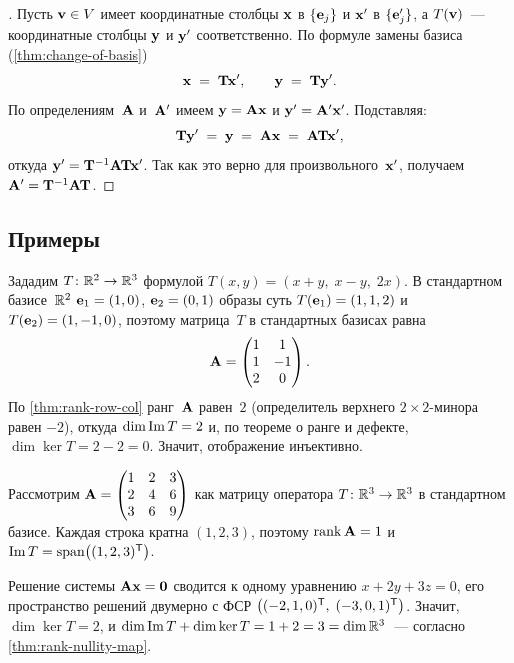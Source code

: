\begin{proof}[]
Пусть $\mathbf{v} \in V$ имеет координатные столбцы $\mathbf{x}$ в
$\{\mathbf{e}_j\}$ и $\mathbf{x}'$ в $\{\mathbf{e}'_j\}$, а $T(\mathbf{v})$~---
координатные столбцы $\mathbf{y}$ и $\mathbf{y}'$ соответственно. По
формуле замены базиса (\cref{thm:change-of-basis})
\[
  \mathbf{x} \;=\; \mathbf{T}\mathbf{x}', \qquad \mathbf{y} \;=\; \mathbf{T}\mathbf{y}'.
\]
По определениям~$\mathbf{A}$ и~$\mathbf{A}'$ имеем $\mathbf{y} = \mathbf{A}\mathbf{x}$
и $\mathbf{y}' = \mathbf{A}' \mathbf{x}'$. Подставляя:
\[
  \mathbf{T}\mathbf{y}' \;=\; \mathbf{y} \;=\; \mathbf{A}\mathbf{x} \;=\; \mathbf{A}\mathbf{T}\mathbf{x}',
\]
откуда $\mathbf{y}' = \mathbf{T}^{-1}\mathbf{A}\mathbf{T}\mathbf{x}'$. Так как это
верно для произвольного~$\mathbf{x}'$, получаем
$\mathbf{A}' = \mathbf{T}^{-1}\mathbf{A}\mathbf{T}$.
\end{proof}

\subsection*{Примеры}

\begin{example}
\label{ex:matrix-of-linear-map}
Зададим $T \colon \mathbb{R}^2 \to \mathbb{R}^3$ формулой
$T(x, y) = (x + y,\; x - y,\; 2x)$. В стандартном базисе~$\mathbb{R}^2$
$\mathbf{e}_1 = (1, 0)$, $\mathbf{e}_2 = (0, 1)$ образы суть
$T(\mathbf{e}_1) = (1, 1, 2)$ и $T(\mathbf{e}_2) = (1, -1, 0)$, поэтому
матрица~$T$ в стандартных базисах равна
\[
  \mathbf{A} = \begin{pmatrix} 1 & 1 \\ 1 & -1 \\ 2 & 0 \end{pmatrix}.
\]
По \cref{thm:rank-row-col} ранг~$\mathbf{A}$ равен~$2$ (определитель
верхнего $2 \times 2$-минора равен $-2$), откуда $\dim \operatorname{Im} T = 2$ и, по
теореме о ранге и дефекте, $\dim \ker T = 2 - 2 = 0$. Значит,
отображение инъективно.
\end{example}

\begin{example}
\label{ex:rank-nullity-numeric}
Рассмотрим
$\mathbf{A} = \begin{pmatrix} 1 & 2 & 3 \\ 2 & 4 & 6 \\ 3 & 6 & 9 \end{pmatrix}$
как матрицу оператора $T \colon \mathbb{R}^3 \to \mathbb{R}^3$ в стандартном базисе.
Каждая строка кратна $(1, 2, 3)$, поэтому $\operatorname{rank} \mathbf{A} = 1$ и
$\operatorname{Im} T = \operatorname{span}\bigl((1, 2, 3)^{\mathsf{T}}\bigr)$.

Решение системы $\mathbf{A}\mathbf{x} = \mathbf{0}$ сводится к одному
уравнению $x + 2y + 3z = 0$, его пространство решений двумерно с ФСР
$\bigl((-2, 1, 0)^{\mathsf{T}},\; (-3, 0, 1)^{\mathsf{T}}\bigr)$. Значит, $\dim \ker T = 2$,
и $\dim \operatorname{Im} T + \dim \ker T = 1 + 2 = 3 = \dim \mathbb{R}^3$~--- согласно
\cref{thm:rank-nullity-map}.
\end{example}

